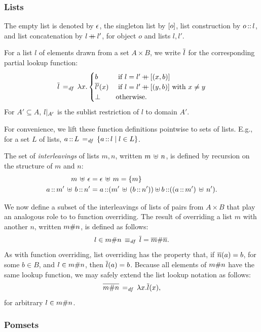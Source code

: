 \documentclass[11pt]{article}
\begin{document}
\subsubsection{Lists}
\label{sec:lists}

The empty list is denoted by $\lnil$, the singleton list by $\lsingle{o}$, list construction by $o \lcons l$, and list concatenation by $l \lapp l'$, for object $o$ and lists $l,l'$. 

For a list $l$ of elements drawn from a set $A \times B$, we write $\funof{l}$ for the corresponding partial lookup function: \[ \funof{l} \eqdef \lambda x .\begin{cases}
	b &\text{ if $l = l' \lapp \lsingle{(x,b)}$}\\
	\funof{l'}(x) &\text{ if $l = l' \lapp \lsingle{(y,b)}$ with $x \neq y$}\\
	\bot & \text{otherwise.}
\end{cases}\] For $A' \subseteq A$, $\restrict{l}{A'}$ is the sublist restriction of $l$ to domain $A'$.

For convenience, we lift these function definitions pointwise to sets of lists. E.g., for a set $L$ of lists, $a \lcons L \eqdef \setof{a \lcons l}{l \in L}$. 

The set of \emph{interleavings} of lists $m,n$, written $m \merge n$, is defined by recursion on the structure of $m$ and $n$: \begin{align*}
	m \merge \lnil & = \lnil \merge m = \set{m} \\ 
	a \lcons m' \merge b \lcons n' & = a \lcons (m' \merge (b\lcons n')) \uplus b \lcons ((a \lcons m') \merge n').
\end{align*}

We now define a subset of the interleavings of lists of pairs from $A \times B$ that play an analogous role to to function overriding. The result of overriding a list $m$ with another $n$, written $m \override n$, is defined as follows: \[ l \in m \override n \iffdef \funof{l} = \funof{m} \override \funof{n}.\] As with function overriding, list overriding has the property that, if $\funof{n}(a) = b$, for some $b \in B$, and $l \in m \override n$, then $\funof{l}(a) = b$. Because all elements of $m \override n$ have the same lookup function, we may safely extend the list lookup notation as follows: \[ \funof{m \override n} \eqdef \lambda x . \funof{l}(x),\] for arbitrary $l \in m \override n$.

\subsubsection{Pomsets}
\end{document}
